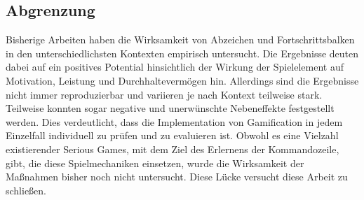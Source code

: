 \documentclass[
    a4paper,
    doc,
    12pt,
    natbib,
]{apa6}
\begin{document}
\subsection{Abgrenzung}
Bisherige Arbeiten haben die Wirksamkeit von Abzeichen und Fortschrittsbalken in den unterschiedlichsten Kontexten empirisch untersucht.
Die Ergebnisse deuten dabei auf ein positives Potential hinsichtlich der Wirkung der Spielelement auf Motivation, Leistung und Durchhaltevermögen hin. Allerdings sind die Ergebnisse nicht immer reproduzierbar und variieren je nach Kontext teilweise stark. Teilweise konnten sogar negative und unerwünschte Nebeneffekte festgestellt werden. Dies verdeutlicht, dass die Implementation von Gamification in jedem Einzelfall individuell zu prüfen und zu evaluieren ist.
Obwohl es eine Vielzahl existierender Serious Games, mit dem Ziel des Erlernens der Kommandozeile, gibt, die diese Spielmechaniken einsetzen, wurde die Wirksamkeit der Maßnahmen bisher noch nicht untersucht. Diese Lücke versucht diese Arbeit zu schließen.




\end{document}
